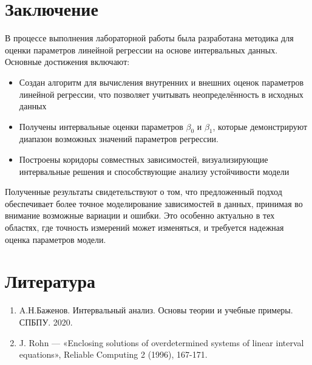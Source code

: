 \documentclass[a4paper, 12pt]{article}
\begin{document}
\section{Заключение}
В процессе выполнения лабораторной работы была разработана методика для оценки параметров линейной регрессии на основе интервальных данных. Основные достижения включают:
\begin{itemize}
    \item Создан алгоритм для вычисления внутренних и внешних оценок параметров линейной
регрессии, что позволяет учитывать неопределённость в исходных данных
    \item Получены интервальные оценки параметров $\beta _0$ и $\beta _1$, которые демонстрируют диапазон
возможных значений параметров регрессии.
    \item Построены коридоры совместных зависимостей, визуализирующие интервальные решения и способствующие анализу устойчивости модели
\end{itemize}
Полученные результаты свидетельствуют о том, что предложенный подход обеспечивает более точное моделирование зависимостей в данных, принимая во внимание возможные вариации
и ошибки. Это особенно актуально в тех областях, где точность измерений может изменяться,
и требуется надежная оценка параметров модели.

\section{Литература}
\begin{enumerate}
    \item A.Н.Баженов. Интервальный анализ. Основы теории и учебные примеры. СПБПУ. 2020.
    \item J. Rohn — «Enclosing solutions of overdetermined systems of linear interval equations», Reliable
Computing 2 (1996), 167-171.
\end{enumerate}
\end{document}
